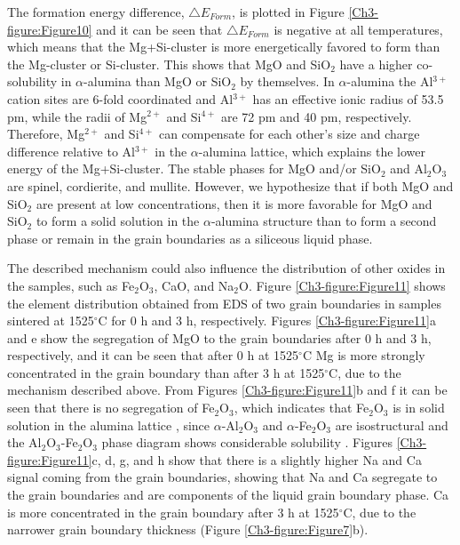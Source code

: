 \noindent The formation energy difference, $\bigtriangleup E_{Form}$, is plotted in Figure \ref{Ch3-figure:Figure10} and it can be seen that $\bigtriangleup E_{Form}$ is negative at all temperatures, which means that the Mg+Si-cluster is more energetically favored to form than the Mg-cluster or Si-cluster. This shows that MgO and SiO$_{2}$ have a higher co-solubility in $\alpha$-alumina than MgO or SiO$_{2}$ by themselves. In $\alpha$-alumina the Al$^{3+}$ cation sites are 6-fold coordinated and Al$^{3+}$ has an effective ionic radius of 53.5 pm, while the radii of Mg$^{2+}$ and Si$^{4+}$ are 72 pm and 40 pm, respectively. Therefore, Mg$^{2+}$ and Si$^{4+}$ can compensate for each other's size and charge difference relative to Al$^{3+}$ in the $\alpha$-alumina lattice, which explains the lower energy of the Mg+Si-cluster. The stable phases for MgO and/or SiO$_{2}$ and Al$_{2}$O$_{3}$ are spinel, cordierite, and mullite. However, we hypothesize that if both MgO and SiO$_{2}$ are present at low concentrations, then it is more favorable for MgO and SiO$_{2}$ to form a solid solution in the $\alpha$-alumina structure than to form a second phase or remain in the grain boundaries as a siliceous liquid phase. 

The described mechanism could also influence the distribution of other oxides in the samples, such as Fe$_{2}$O$_{3}$, CaO, and Na$_{2}$O. Figure \ref{Ch3-figure:Figure11} shows the element distribution obtained from EDS of two grain boundaries in samples sintered at 1525$^{\circ}$C for 0 h and 3 h, respectively. Figures \ref{Ch3-figure:Figure11}a and e show the segregation of MgO to the grain boundaries after 0 h and 3 h, respectively, and it can be seen that after 0 h at 1525$^{\circ}$C Mg is more strongly concentrated in the grain boundary than after 3 h at 1525$^{\circ}$C, due to the mechanism described above. From Figures \ref{Ch3-figure:Figure11}b and f it can be seen that there is no segregation of Fe$_{2}$O$_{3}$, which indicates that Fe$_{2}$O$_{3}$ is in solid solution in the alumina lattice \cite{Atkinson2003}, since $\alpha$-Al$_{2}$O$_{3}$ and $\alpha$-Fe$_{2}$O$_{3}$ are isostructural and the Al$_{2}$O$_{3}$-Fe$_{2}$O$_{3}$ phase diagram shows considerable solubility \cite{Raghavan2010}. Figures \ref{Ch3-figure:Figure11}c, d, g, and h show that there is a slightly higher Na and Ca signal coming from the grain boundaries, showing that Na and Ca segregate to the grain boundaries and are components of the liquid grain boundary phase. Ca is more concentrated in the grain boundary after 3 h at 1525$^{\circ}$C, due to the narrower grain boundary thickness (Figure \ref{Ch3-figure:Figure7}b). 

